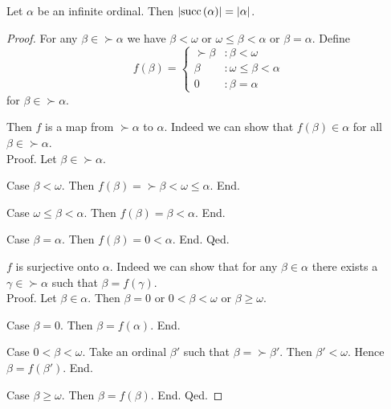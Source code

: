 \documentclass[../set-theory.tex]{subfiles}
\begin{document}
  \begin{forthel}
    \begin{proposition}
      Let $\alpha$ be an infinite ordinal.
      Then $\left\vert\mathrm{succ}\left(\alpha\right)\right\vert = \left\vert\alpha\right\vert$.
    \end{proposition}
    \begin{proof}
      For any $\beta \in \succ{\alpha}$ we have
      $\beta \less \omega$ or $\omega \leq \beta \less \alpha$ or $\beta = \alpha$.
      Define \[ f(\beta) =
        \begin{cases}
          \succ{\beta}  & : \beta \less \omega
          \\
          \beta         & : \omega \leq \beta \less \alpha
          \\
          0             & : \beta = \alpha
        \end{cases} \]
      for $\beta \in \succ{\alpha}$.

      Then $f$ is a map from $\succ{\alpha}$ to $\alpha$.
      Indeed we can show that $f(\beta) \in \alpha$ for all
      $\beta \in \succ{\alpha}$. \\
      Proof.
        Let $\beta \in \succ{\alpha}$.

        Case $\beta \less \omega$.
          Then $f(\beta)
            = \succ{\beta}
            \less \omega
            \leq \alpha$.
        End.

        Case $\omega \leq \beta \less \alpha$.
          Then $f(\beta)
            = \beta
            \less \alpha$.
        End.

        Case $\beta = \alpha$.
          Then $f(\beta)
            = 0
            \less \alpha$.
        End.
      Qed.

      $f$ is surjective onto $\alpha$.
      Indeed we can show that for any $\beta \in \alpha$ there exists a
      $\gamma \in \succ{\alpha}$ such that $\beta = f(\gamma)$. \\
      Proof.
        Let $\beta \in \alpha$.
        Then $\beta = 0$ or $0 \less \beta \less \omega$ or $\beta \geq \omega$.

        Case $\beta = 0$.
          Then $\beta = f(\alpha)$.
        End.

        Case $0 \less \beta \less \omega$.
          Take an ordinal $\beta'$ such that $\beta = \succ{\beta'}$.
          Then $\beta' \less \omega$.
          Hence $\beta = f(\beta')$.
        End.

        Case $\beta \geq \omega$.
          Then $\beta = f(\beta)$.
        End.
      Qed.


\end{proof}
\end{forthel}
\end{document}
